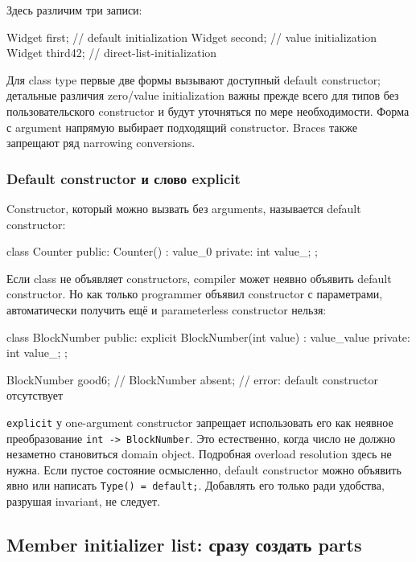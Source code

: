 Здесь различим три записи:

\begin{cppcode}
Widget first;          // default initialization
Widget second{};       // value initialization
Widget third{42};      // direct-list-initialization
\end{cppcode}

Для class type первые две формы вызывают доступный default constructor;
детальные различия zero/value initialization важны прежде всего для типов без
пользовательского constructor и будут уточняться по мере необходимости.
Форма с argument напрямую выбирает подходящий constructor. Braces также
запрещают ряд narrowing conversions.

\subsubsection{Default constructor и слово explicit}

Constructor, который можно вызвать без arguments, называется default
constructor:

\begin{cppcode}
class Counter {
public:
    Counter() : value_{0} {}
private:
    int value_;
};
\end{cppcode}

Если class не объявляет constructors, compiler может неявно объявить default
constructor. Но как только programmer объявил constructor с параметрами,
автоматически получить ещё и parameterless constructor нельзя:

\begin{cppcode}
class BlockNumber {
public:
    explicit BlockNumber(int value) : value_{value} {}
private:
    int value_;
};

BlockNumber good{6};
// BlockNumber absent; // error: default constructor отсутствует
\end{cppcode}

\texttt{explicit} у one-argument constructor запрещает использовать его как
неявное преобразование \texttt{int -> BlockNumber}. Это естественно, когда
число не должно незаметно становиться domain object. Подробная overload
resolution здесь не нужна. Если пустое состояние осмысленно, default
constructor можно объявить явно или написать \texttt{Type() = default;}.
Добавлять его только ради удобства, разрушая invariant, не следует.

\subsection{Member initializer list: сразу создать parts}

